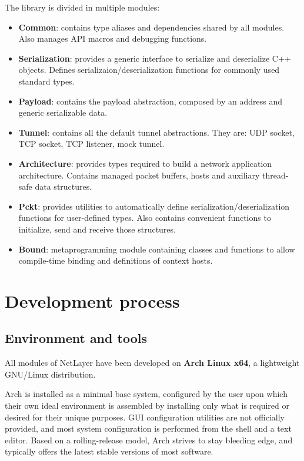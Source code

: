\documentclass[11pt]{report}
\newcommand{\+}{\discretionary{\mbox{\scriptsize$\hookleftarrow$}}{}{}}
\renewcommand\emph{\textbf}
\begin{document}
        The library is divided in multiple modules:
        \begin{itemize}
            \item \emph{Common}: contains type aliases and dependencies shared by all modules. Also manages API macros and debugging functions.
            \item \emph{Serialization}: provides a generic interface to serialize and deserialize C++ objects. Defines serializaion/deserialization functions for commonly used standard types.
            \item \emph{Payload}: contains the payload abstraction, composed by an address and generic serializable data.
            \item \emph{Tunnel}: contains all the default tunnel abstractions. They are: UDP socket, TCP socket, TCP listener, mock tunnel.
            \item \emph{Architecture}: provides types required to build a network application architecture. Contains managed packet buffers, hosts and auxiliary thread-safe data structures. 
            \item \emph{Pckt}: provides utilities to automatically define serialization/deserialization functions for user-defined types. Also contains convenient functions to initialize, send and receive those structures.
            \item \emph{Bound}: metaprogramming module containing classes and functions to allow compile-time binding and definitions of context hosts.
        \end{itemize}

        \chapter{Development process}

            \section{Environment and tools}
                All modules of NetLayer have been developed on \emph{Arch Linux x64}, a lightweight GNU/Linux distribution.

                Arch is installed as a minimal base system, configured by the user upon which their own ideal environment is assembled by installing only what is required or desired for their unique purposes. GUI configuration utilities are not officially provided, and most system configuration is performed from the shell and a text editor. Based on a rolling-release model, Arch strives to stay bleeding edge, and typically offers the latest stable versions of most software.
\end{document}
